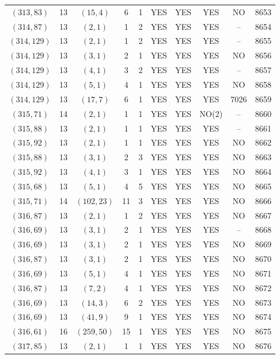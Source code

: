 \begin{longtable}{|c|c|c|c|c|c|c|c|c|c|}
$(313, 83)$ & 13 & $(15, 4)$ & 6 & 1 & YES & YES & YES & NO & 8653\\
$(314, 87)$ & 13 & $(2, 1)$ & 1 & 2 & YES & YES & YES & -- & 8654\\
$(314, 129)$ & 13 & $(2, 1)$ & 1 & 2 & YES & YES & YES & -- & 8655\\
$(314, 129)$ & 13 & $(3, 1)$ & 2 & 1 & YES & YES & YES & NO & 8656\\
$(314, 129)$ & 13 & $(4, 1)$ & 3 & 2 & YES & YES & YES & -- & 8657\\
$(314, 129)$ & 13 & $(5, 1)$ & 4 & 1 & YES & YES & YES & NO & 8658\\
$(314, 129)$ & 13 & $(17, 7)$ & 6 & 1 & YES & YES & YES & 7026 & 8659\\
$(315, 71)$ & 14 & $(2, 1)$ & 1 & 1 & YES & YES & NO(2) & -- & 8660\\
$(315, 88)$ & 13 & $(2, 1)$ & 1 & 1 & YES & YES & YES & -- & 8661\\
$(315, 92)$ & 13 & $(2, 1)$ & 1 & 1 & YES & YES & YES & NO & 8662\\
$(315, 88)$ & 13 & $(3, 1)$ & 2 & 3 & YES & YES & YES & NO & 8663\\
$(315, 92)$ & 13 & $(4, 1)$ & 3 & 1 & YES & YES & YES & NO & 8664\\
$(315, 68)$ & 13 & $(5, 1)$ & 4 & 5 & YES & YES & YES & NO & 8665\\
$(315, 71)$ & 14 & $(102, 23)$ & 11 & 3 & YES & YES & YES & NO & 8666\\
$(316, 87)$ & 13 & $(2, 1)$ & 1 & 2 & YES & YES & YES & NO & 8667\\
$(316, 69)$ & 13 & $(3, 1)$ & 2 & 1 & YES & YES & YES & -- & 8668\\
$(316, 69)$ & 13 & $(3, 1)$ & 2 & 1 & YES & YES & YES & NO & 8669\\
$(316, 87)$ & 13 & $(3, 1)$ & 2 & 1 & YES & YES & YES & NO & 8670\\
$(316, 69)$ & 13 & $(5, 1)$ & 4 & 1 & YES & YES & YES & NO & 8671\\
$(316, 87)$ & 13 & $(7, 2)$ & 4 & 1 & YES & YES & YES & NO & 8672\\
$(316, 69)$ & 13 & $(14, 3)$ & 6 & 2 & YES & YES & YES & NO & 8673\\
$(316, 69)$ & 13 & $(41, 9)$ & 9 & 1 & YES & YES & YES & NO & 8674\\
$(316, 61)$ & 16 & $(259, 50)$ & 15 & 1 & YES & YES & YES & NO & 8675\\
$(317, 85)$ & 13 & $(2, 1)$ & 1 & 1 & YES & YES & YES & NO & 8676\\

\end{longtable}
